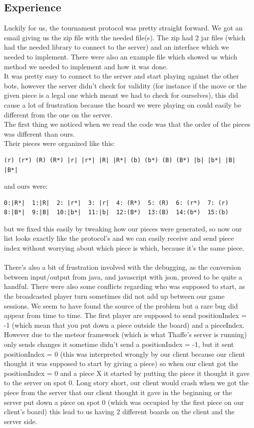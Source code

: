 \documentclass[12pt, a4paper]{article}
\begin{document}
\subsection{Experience}
Luckily for us, the tournament protocol was pretty straight forward. We got an email giving us the zip file with the needed file(s). The zip had 2 jar files (which had the needed library to connect to the server) and an interface which we needed to implement. There were also an example file which showed us which method we needed to implement and how it was done. \\
It was pretty easy to connect to the server and start playing against the other bots, however the server didn't check for validity (for instance if the move or the given piece is a legal one which meant we had to check for ourselves), this did cause a lot of frustration because the board we were playing on could easily be different from the one on the server. \\
The first thing we noticed when we read the code was that the order of the pieces was different than ours.\\
Their pieces were organized like this:
\begin{verbatim}
(r) (r*) (R) (R*) |r| |r*| |R| |R*| (b) (b*) (B) (B*) |b| |b*| |B| |B*|
\end{verbatim}
and ours were:
\begin{verbatim}
0:|R*|  1:|R|  2: |r*|  3: |r|  4: (R*)  5: (R)  6: (r*)  7: (r)
8:|B*|  9:|B|  10:|b*|  11:|b|  12:(B*)  13:(B)  14:(b*)  15:(b)
\end{verbatim}
but we fixed this easily by tweaking how our pieces were generated, so now our list looks exactly like the protocol's and we can easily receive and send piece index without worrying about which piece is which, because it's the same piece.\\ \\
There's also a bit of frustration involved with the debugging, as the conversion between input/output from java, and javascript with json, proved to be quite a handful. There were also some conflicts regarding who was supposed to start, as the broadcasted player turn sometimes did not add up between our game sessions. We seem to have found the source of the problem but a rare bug did appear from time to time. The first player are supposed to send positionIndex = -1 (which mean that you put down a piece outside the board) and a pieceIndex. However due to the meteor framework (which is what Thaffe's server is running) only sends changes it sometime didn't send a positionIndex = -1, but it sent positionIndex = 0 (this was interpreted wrongly by our client because our client thought it was supposed to start by giving a piece) so when our client got the positionIndex = 0 and a piece X it started by putting the piece it thought it gave to the server on spot 0. Long story short, our client would crash when we got the piece from the server that our client thought it gave in the beginning or the server put down a piece on spot 0 (which was occupied by the first piece on our client's board) this lead to us having 2 different boards on the client and the server side.\\ 
\end{document}
